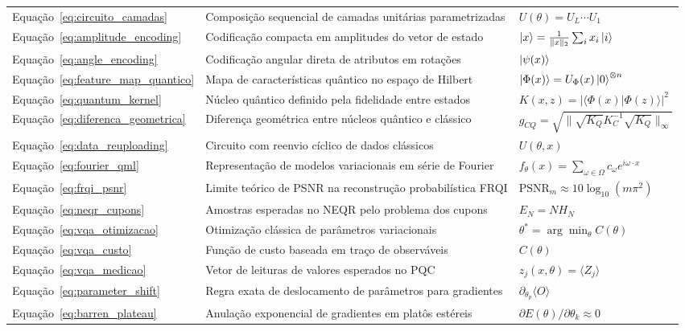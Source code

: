 \documentclass[
    12pt,
    openright,
    oneside,
    a4paper,
    english,
    brazil
]{abntex2}
\begin{document}
\begin{longtable}{@{}p{2.9cm}p{7.8cm}p{\dimexpr\textwidth-10.7cm-4\tabcolsep\relax}@{}}
Equação~\eqref{eq:circuito_camadas} & Composição sequencial de camadas unitárias parametrizadas & \(U(\theta) = U_L\cdots U_1\) \\
Equação~\eqref{eq:amplitude_encoding} & Codificação compacta em amplitudes do vetor de estado & \(\ket{x} = \frac{1}{\|x\|_2}\sum_i x_i\ket{i}\) \\
Equação~\eqref{eq:angle_encoding} & Codificação angular direta de atributos em rotações & \(\ket{\psi(x)}\) \\
Equação~\eqref{eq:feature_map_quantico} & Mapa de características quântico no espaço de Hilbert & \(\ket{\Phi(x)} = U_\Phi(x)\ket{0}^{\otimes n}\) \\
Equação~\eqref{eq:quantum_kernel} & Núcleo quântico definido pela fidelidade entre estados & \(K(x,z) = |\langle\Phi(x)|\Phi(z)\rangle|^2\) \\
Equação~\eqref{eq:diferenca_geometrica} & Diferença geométrica entre núcleos quântico e clássico & \(g_{CQ} = \sqrt{\|\sqrt{K_Q}K_C^{-1}\sqrt{K_Q}\|_\infty}\) \\
Equação~\eqref{eq:data_reuploading} & Circuito com reenvio cíclico de dados clássicos & \(U(\theta, x)\) \\
Equação~\eqref{eq:fourier_qml} & Representação de modelos variacionais em série de Fourier & \(f_\theta(x) = \sum_{\omega\in\Omega} c_\omega e^{i\omega\cdot x}\) \\
Equação~\eqref{eq:frqi_psnr} & Limite teórico de PSNR na reconstrução probabilística FRQI & \(\mathrm{PSNR}_m \approx 10\log_{10}(m\pi^2)\) \\
Equação~\eqref{eq:neqr_cupons} & Amostras esperadas no NEQR pelo problema dos cupons & \(E_N = N H_N\) \\
Equação~\eqref{eq:vqa_otimizacao} & Otimização clássica de parâmetros variacionais & \(\theta^* = \arg\min_\theta C(\theta)\) \\
Equação~\eqref{eq:vqa_custo} & Função de custo baseada em traço de observáveis & \(C(\theta)\) \\
Equação~\eqref{eq:vqa_medicao} & Vetor de leituras de valores esperados no PQC & \(z_j(x,\theta) = \langle Z_j \rangle\) \\
Equação~\eqref{eq:parameter_shift} & Regra exata de deslocamento de parâmetros para gradientes & \(\partial_{\theta_p}\langle O\rangle\) \\
Equação~\eqref{eq:barren_plateau} & Anulação exponencial de gradientes em platôs estéreis & \(\partial E(\theta)/\partial\theta_k \approx 0\) \\

\end{longtable}
\end{document}
